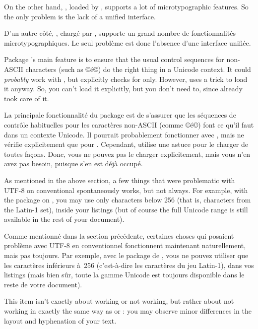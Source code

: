 \documentclass{lltxdoc}
\begin{document}
On the other hand, , loaded by , supports a lot of
microtypographic features. So the only problem is the lack of a unified
interface.

D'un autre côté, , chargé par , supporte un grand nombre de fonctionnalités microtypographiques. Le seul problème est donc l'absence d'une interface unifiée.

Package 's main feature is to ensure that the usual control
sequences for non-ASCII characters (such as ©\'e©) do the right thing in a
Unicode context. It could \emph{probably} work with \luatex, but explicitly
checks for \xetex only. However,  uses a trick to load it anyway.
So, you can't load it explicitly, but you don't need to, since 
already took care of it.

La principale fonctionnalité du package  est de s'assurer que les séquences de contrôle habituelles pour les caractères non-ASCII (comme ©\'e©) font ce qu'il faut dans un contexte Unicode. Il pourrait probablement fonctionner avec \luatex, mais ne vérifie explicitement que pour \xetex. Cependant,  utilise une astuce pour le charger de toutes façons. Donc, vous ne pouvez pas le charger explicitement, mais vous n'en avez pas besoin, puisque  s'en est déjà occupé.

As mentioned in the above section, a few things that were problematic with
UTF-8 on conventional \latex spontaneously works, but not always. For example,
with the  package on \lualatex, you may use only characters below
256 (that is, characters from the Latin-1 set), inside your listings (but of
course the full Unicode range is still available in the rest of your document).

Comme mentionné dans la section précédente, certaines choses qui posaient problème avec UTF-8 en \latex conventionnel fonctionnent maintenant naturellement, mais pas toujours. Par exemple, avec le package  de \lualatex, vous ne pouvez utiliser que les caractères inférieurs à~256 (c'est-à-dire les caractères du jeu Latin-1), dans vos listings (mais bien sûr, toute la gamme Unicode est toujours disponible dans le reste de votre document).

This item isn't exactly about working or not working, but rather about not
working in exactly the same way as \pdftex or \xetex: you may observe minor
differences in the layout and hyphenation of your text.
\end{document}
